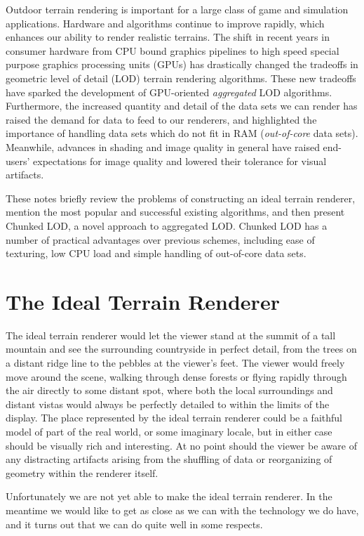\documentclass[12pt]{article}
\begin{document}
Outdoor terrain rendering is important for a large class of game and
simulation applications.  Hardware and algorithms continue to improve
rapidly, which enhances our ability to render realistic terrains.  The
shift in recent years in consumer hardware from CPU bound graphics
pipelines to high speed special purpose graphics processing units
(GPUs) has drastically changed the tradeoffs in geometric level of
detail (LOD) terrain rendering algorithms.  These new tradeoffs have
sparked the development of GPU-oriented {\em aggregated } LOD
algorithms.  Furthermore, the increased quantity and detail of the
data sets we can render has raised the demand for data to feed to our
renderers, and highlighted the importance of handling data sets which
do not fit in RAM ({\em out-of-core } data sets).  Meanwhile, advances
in shading and image quality in general have raised end-users'
expectations for image quality and lowered their tolerance for visual
artifacts.
 
These notes briefly review the problems of constructing an ideal
terrain renderer, mention the most popular and successful existing
algorithms, and then present Chunked LOD, a novel approach to
aggregated LOD.  Chunked LOD has a number of practical advantages over
previous schemes, including ease of texturing, low CPU load and simple
handling of out-of-core data sets.
 
\section{The Ideal Terrain Renderer}

The ideal terrain renderer would let the viewer stand at the summit of
a tall mountain and see the surrounding countryside in perfect detail,
from the trees on a distant ridge line to the pebbles at the
viewer's feet.  The viewer would freely move around the scene,
walking through dense forests or flying rapidly through the air
directly to some distant spot, where both the local surroundings and
distant vistas would always be perfectly detailed to within the limits
of the display.  The place represented by the ideal terrain renderer
could be a faithful model of part of the real world, or some imaginary
locale, but in either case should be visually rich and interesting.
At no point should the viewer be aware of any distracting artifacts
arising from the shuffling of data or reorganizing of geometry within
the renderer itself.
 
Unfortunately we are not yet able to make the ideal terrain renderer.
In the meantime we would like to get as close as we can with the
technology we do have, and it turns out that we can do quite well in
some respects.
 
\end{document}
